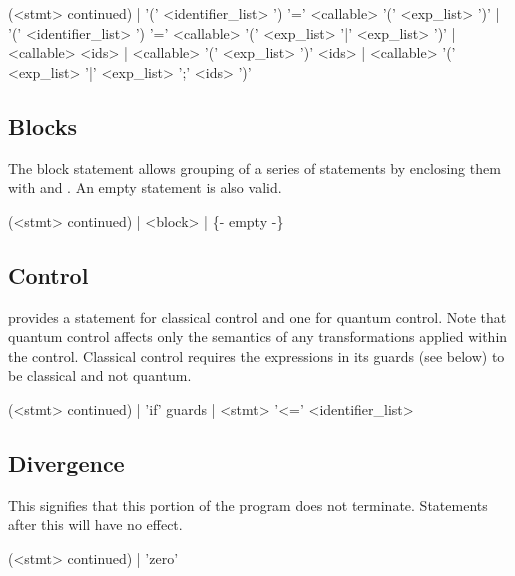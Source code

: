 \begin{singlespace}
\begin{bnf}   
   (<stmt> continued)  
        | '(' <identifier_list> ') '=' 
	      <callable>  '(' <exp_list> ')'
        | '(' <identifier_list> ') '='
	      <callable>  '(' <exp_list> '|' <exp_list> ')'
        | <callable> <ids>
        | <callable> '(' <exp_list> ')' <ids>
        | <callable> '(' <exp_list> '|' <exp_list> ';' 
	      <ids> ')'
\end{bnf}
\end{singlespace}

\subsection{Blocks} 
The block statement allows grouping of a 
series of statements by enclosing them with \inlqpl{\{} and \inlqpl{\}}.
An empty statement is also valid.

\begin{singlespace}
\begin{bnf}   
   (<stmt> continued)  
        |  <block>  
	| \{- empty -\}  
\end{bnf}
\end{singlespace}

\subsection{Control} 
\lqpl{} provides a statement for classical control and
one for quantum control. Note that quantum control affects only the semantics
of any transformations applied within the control. Classical control requires
the expressions in its guards (see below) to be classical and not quantum.

\begin{singlespace}
\begin{bnf}   
   (<stmt> continued)  
        | 'if' guards
	| <stmt> '<=' <identifier_list>
\end{bnf}
\end{singlespace}

\subsection{Divergence}
 This signifies that this portion of the program does not
terminate. Statements after this will have no effect. 
\begin{singlespace}
\begin{bnf}   
   (<stmt> continued)  
        | 'zero'                       
\end{bnf}
\end{singlespace}

